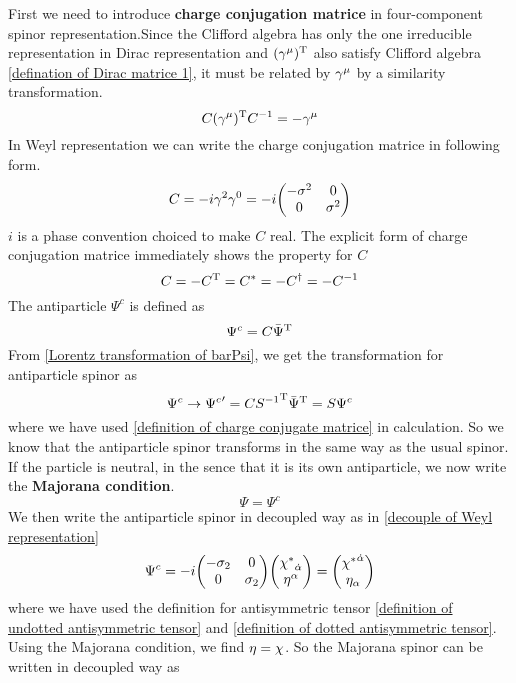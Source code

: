 First we need to introduce \textbf{charge conjugation matrice} in four-component spinor representation.Since the Clifford algebra has only the one irreducible representation in Dirac representation and $(\gamma^{\mu})^{\text{T}}$ also satisfy Clifford algebra \eqref{defination of Dirac matrice 1}, it must be related by $\gamma^{\mu}$ by a similarity transformation. 
\begin{equation}\label{definition of charge conjugate matrice}
  C (\gamma^{\mu})^{\text{T}} C^{-1} = -\gamma^{\mu}
\end{equation}
In Weyl representation we can write the charge conjugation matrice in following form.
\begin{equation}
C =- i \g^2\g^0 
= -i\mqty(-\s^{2} & 0    \\
          0      & \s^{2})
\end{equation}
$i$ is a phase convention choiced to make $C$ real. The explicit form of charge conjugation matrice immediately shows the property for $C$
\begin{equation}
C = - C^{\text{T}} = C^{*} = -C^{\dagger} = -C^{-1}
\end{equation}
The antiparticle $\Psi^{c}$ is defined as
\begin{equation}
\Psi^{c} = C \bar{\Psi}^{\text{T}}
\end{equation}
From \eqref{Lorentz transformation of barPsi}, we get the transformation for antiparticle spinor as
\begin{equation}
\Psi^{c} \rightarrow {\Psi^{c}}' = C {S^{-1}}^{\text{T}} {\bar\Psi}^{\text{T}}
 =S \Psi^{c}
\end{equation}
where we have used \eqref{definition of charge conjugate matrice} in calculation. So we know that the antiparticle spinor transforms in the same way as the usual spinor. If the particle is neutral, in the sence that it is its own antiparticle, we now write the \textbf{Majorana condition}.
\begin{equation}\label{Majorana condition}
 \Psi = \Psi^{c}
\end{equation}
We then write the antiparticle spinor in decoupled way as in \eqref{decouple of Weyl representation} 
\begin{equation}
\Psi^{c} = -i\mqty(-\s_{2} & 0    \\
           0      & \s_{2})
           \mqty(\lc_{\doa}  \\ \h^{\a} )
         = \mqty(\lc^{\doa} \\ \h_{\a})
\end{equation}
where we have used the definition for antisymmetric tensor \eqref{definition of undotted antisymmetric tensor} and \eqref{definition of dotted antisymmetric tensor}. Using the Majorana condition, we find $\eta = \chi$. So the Majorana spinor can be written in decoupled way as
